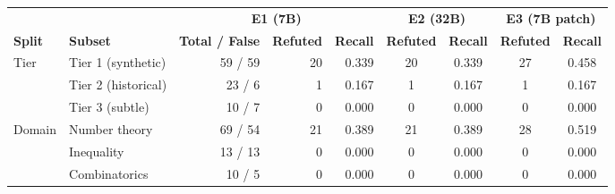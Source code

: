 \begin{tabular}{llrrrcccc}
\toprule
& & \multicolumn{3}{c}{\textbf{E1 (7B)}} & \multicolumn{2}{c}{\textbf{E2 (32B)}} & \multicolumn{2}{c}{\textbf{E3 (7B patch)}} \\
\cmidrule(lr){3-5}\cmidrule(lr){6-7}\cmidrule(lr){8-9}
\textbf{Split} & \textbf{Subset} & \textbf{Total / False} & \textbf{Refuted} & \textbf{Recall} & \textbf{Refuted} & \textbf{Recall} & \textbf{Refuted} & \textbf{Recall} \\
\midrule
\multirow{3}{*}{Tier}
  & Tier 1 (synthetic)  & 59 / 59 & 20 & 0.339 & 20 & 0.339 & 27 & 0.458 \\
  & Tier 2 (historical) & 23 / 6  &  1 & 0.167 &  1 & 0.167 &  1 & 0.167 \\
  & Tier 3 (subtle)     & 10 / 7  &  0 & 0.000 &  0 & 0.000 &  0 & 0.000 \\
\midrule
\multirow{3}{*}{Domain}
  & Number theory       & 69 / 54 & 21 & 0.389 & 21 & 0.389 & 28 & 0.519 \\
  & Inequality          & 13 / 13 &  0 & 0.000 &  0 & 0.000 &  0 & 0.000 \\
  & Combinatorics       & 10 / 5  &  0 & 0.000 &  0 & 0.000 &  0 & 0.000 \\
\bottomrule
\end{tabular}
